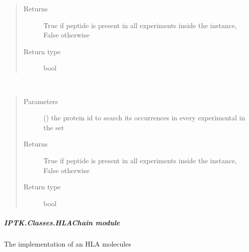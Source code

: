 \documentclass[letterpaper,10pt,english]{sphinxmanual}
\begin{document}
\begin{fulllineitems}
\begin{fulllineitems}
\begin{quote}
\begin{description}
\item[{Returns}] \leavevmode
True if peptide is present in all experiments inside the instance, False otherwise

\item[{Return type}] \leavevmode
bool

\end{description}\end{quote}

\end{fulllineitems}


\begin{fulllineitems}
\label{\detokenize{IPTK.Classes:IPTK.Classes.ExperimentalSet.ExperimentSet.is_protein_present_in_all}}~\begin{quote}\begin{description}
\item[{Parameters}] \leavevmode
{} () \textendash{} the protein id to search its occurrences in every experimental in the set

\item[{Returns}] \leavevmode
True if peptide is present in all experiments inside the instance, False otherwise

\item[{Return type}] \leavevmode
bool

\end{description}\end{quote}

\end{fulllineitems}


\end{fulllineitems}



\subparagraph{IPTK.Classes.HLAChain module}
\label{\detokenize{IPTK.Classes:module-IPTK.Classes.HLAChain}}\label{\detokenize{IPTK.Classes:iptk-classes-hlachain-module}}
The implementation of an HLA molecules
\end{document}
